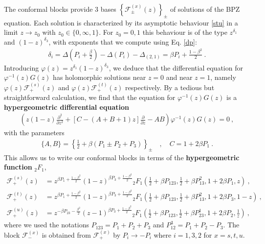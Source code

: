 \documentclass[12pt, a4paper]{article}
\newcommand{\myindex}[1]{\textbf{\boldmath #1}}
\begin{document}
The conformal blocks provide 3 bases $\left\{\mathcal{F}^{(x)}_\pm(z)\right\}_\pm$ of solutions of the BPZ equation. Each solution is characterized by its asymptotic behaviour \eqref{stu} in a limit $z\to z_0$ with $z_0\in\{0,\infty,1\}$. 
For $z_0=0,1$ this behaviour is of the type $z^{\delta_1}$ and $(1-z)^{\delta_3}$, with exponents that we compute using Eq. \eqref{dp}:
\begin{align}
 \delta_i=\Delta\left(P_i+\tfrac{\beta}{2}\right) - \Delta(P_i) -\Delta_{(2,1)} = \beta P_i + \tfrac{1-\beta^2}{2}\ .
\end{align}
Introducing $\varphi(z) = z^{\delta_1}(1-z)^{\delta_3}$, we deduce that the differential equation for $\varphi^{-1}(z) G(z)$ has holomorphic solutions near $z=0$ and near $z=1$, namely $\varphi(z)\mathcal{F}^{(s)}_+(z)$ and $\varphi(z)\mathcal{F}^{(t)}_+(z)$ respectively. By a tedious but straightforward calculation, we find that the equation for $\varphi^{-1}(z) G(z)$ is a \myindex{hypergeometric differential equation} 
\begin{align}
 \left(z(1-z)\frac{\partial^2}{\partial z^2} + \left[C-(A+B+1)z\right]\frac{\partial}{\partial z} -AB\right) \varphi^{-1}(z) G(z) = 0 \ , 
\end{align}
with the parameters 
\begin{align}
 \{A,B\} = \left\{\tfrac12+\beta(P_1\pm P_2+P_3)\right\}_\pm \quad , \quad  C=1+2\beta P_1\ .
\end{align}
This allows us to write our conformal blocks in terms of the \myindex{hypergeometric function}  ${}_2F_1$,
\begin{subequations}
\begin{align}
 \mathcal{F}_+^{(s)}(z) &= z^{\beta P_1 +\frac{1-\beta^2}{2}}(1-z)^{\beta P_3 + \frac{1-\beta^2}{2}} {}_2F_1\left(\tfrac12+ \beta P_{123},\tfrac12+\beta P_{13}^2,1+2\beta P_1,z\right) \ , 
 \\
 \mathcal{F}_+^{(t)}(z) &= z^{\beta P_1 +\frac{1-\beta^2}{2}}(1-z)^{\beta P_3 + \frac{1-\beta^2}{2}} {}_2F_1\left(\tfrac12+ \beta P_{123},\tfrac12+\beta P_{13}^2,1+2\beta P_3,1-z\right) \ , 
 \\
 \mathcal{F}_+^{(u)}(z) &= z^{-\beta P_{23} -\frac{\beta^2}{2}}(z-1)^{\beta P_3 + \frac{1-\beta^2}{2}} {}_2F_1\left(\tfrac12+ \beta P_{123},\tfrac12+\beta P_{23}^1,1+2\beta P_2,\tfrac{1}{z}\right) \ , 
\end{align}
\end{subequations}
where we used the notations $P_{123}=P_1+P_2+P_3$ and $P_{12}^3 = P_1+P_2-P_3$. The block $\mathcal{F}^{(x)}_-$ is obtained from $\mathcal{F}^{(x)}_+$ by $P_i\to -P_i$ where $i=1,3,2$ for $x=s,t,u$. 
\end{document}
